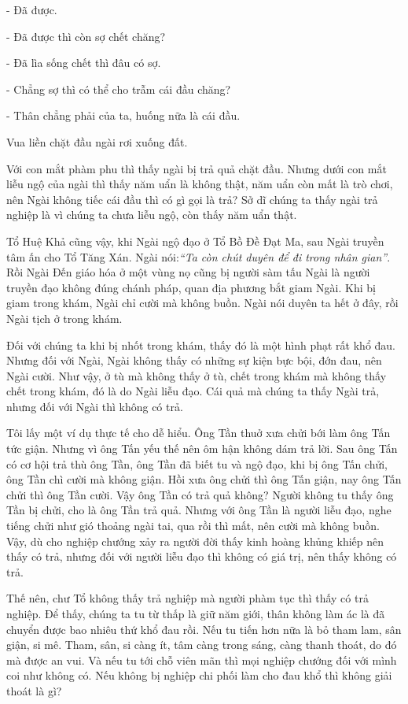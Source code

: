 \documentclass[
  12pt,
  oneside]{book}
\begin{document}
- Đã được.

- Đã được thì còn sợ chết chăng?

- Đã lìa sống chết thì đâu có sợ.

- Chẳng sợ thì có thể cho trẫm cái đầu chăng?

- Thân chẳng phải của ta, huống nữa là cái đầu.

Vua liền chặt đầu ngài rơi xuống đất.

Với con mắt phàm phu thì thấy ngài bị trả quả chặt đầu. Nhưng dưới con mắt liễu ngộ của ngài thì thấy năm uẩn là không thật, năm uẩn còn mất là trò chơi, nên Ngài không tiếc cái đầu thì có gì gọi là trả? Sở dĩ chúng ta thấy ngài trả nghiệp là vì chúng ta chưa liễu ngộ, còn thấy năm uẩn thật.

Tổ Huệ Khả cũng vậy, khi Ngài ngộ đạo ở Tổ Bồ Đề Đạt Ma, sau Ngài truyền tâm ấn cho Tổ Tăng Xán. Ngài nói:\emph{``Ta còn chút duyên để đi trong nhân gian''}. Rồi Ngài Đến giáo hóa ở một vùng nọ cũng bị người sàm tấu Ngài là người truyền đạo không đúng chánh pháp, quan địa phương bắt giam Ngài. Khi bị giam trong khám, Ngài chỉ cười mà không buồn. Ngài nói duyên ta hết ở đây, rồi Ngài tịch ở trong khám.

Đối với chúng ta khi bị nhốt trong khám, thấy đó là một hình phạt rất khổ đau. Nhưng đối với Ngài, Ngài không thấy có những sự kiện bực bội, đớn đau, nên Ngài cười. Như vậy, ở tù mà không thấy ở tù, chết trong khám mà không thấy chết trong khám, đó là do Ngài liễu đạo. Cái quả mà chúng ta thấy Ngài trả, nhưng đối với Ngài thì không có trả.

Tôi lấy một ví dụ thực tế cho dễ hiểu. Ông Tần thuở xưa chửi bới làm ông Tấn tức giận. Nhưng vì ông Tấn yếu thế nên ôm hận không dám trả lời. Sau ông Tấn có cơ hội trả thù ông Tần, ông Tần đã biết tu và ngộ đạo, khi bị ông Tấn chửi, ông Tần chì cười mà không giận. Hồi xưa ông chửi thì ông Tấn giận, nay ông Tấn chửi thì ông Tần cười. Vậy ông Tần có trả quả không? Người không tu thấy ông Tần bị chửi, cho là ông Tần trả quả. Nhưng với ông Tần là người liễu đạo, nghe tiếng chửi như gió thoảng ngài tai, qua rồi thì mất, nên cười mà không buồn. Vậy, dù cho nghiệp chướng xảy ra người đời thấy kinh hoàng khủng khiếp nên thấy có trả, nhưng đối với người liễu đạo thì không có giá trị, nên thấy không có trả.

Thế nên, chư Tổ không thấy trả nghiệp mà người phàm tục thì thấy có trả nghiệp. Để thấy, chúng ta tu từ thấp là giữ năm giới, thân không làm ác là đã chuyển được bao nhiêu thứ khổ đau rồi. Nếu tu tiến hơn nữa là bỏ tham lam, sân giận, si mê. Tham, sân, si càng ít, tâm càng trong sáng, càng thanh thoát, do đó mà được an vui. Và nếu tu tới chỗ viên mãn thì mọi nghiệp chướng đối với mình coi như không có. Nếu không bị nghiệp chi phối làm cho đau khổ thì không giải thoát là gì?
\end{document}
